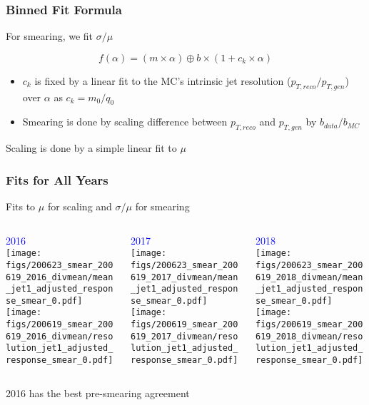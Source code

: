 \documentclass{beamer}
\begin{document}
\begin{frame}
  \frametitle{Binned Fit Formula}

  For smearing, we fit $\sigma/\mu$

  \[
  f(\alpha) = (m \times \alpha) \oplus b \times (1 + c_k \times \alpha)
  \]

  \begin{itemize}
  \item $c_k$ is fixed by a linear fit to the MC's intrinsic jet resolution ($p_{T, reco}/p_{T, gen}$) over $\alpha$ as $c_k = m_0/q_0$
  \item Smearing is done by scaling difference between $p_{T,reco}$ and $p_{T,gen}$ by $b_{data}/b_{MC}$
  \end{itemize}

  \vfill

  Scaling is done by a simple linear fit to $\mu$

\end{frame}


\begin{frame}
  \frametitle{Fits for All Years}

  Fits to $\mu$ for scaling and $\sigma/\mu$ for smearing
  \vfill

  \begin{columns}
    \begin{column}{0.33\linewidth}
      \centering
      \textcolor{blue}{2016} \\
      \texttt{[image: figs/200623\_smear\_200619\_2016\_divmean/mean\_jet1\_adjusted\_response\_smear\_0.pdf]} \\
      \texttt{[image: figs/200619\_smear\_200619\_2016\_divmean/resolution\_jet1\_adjusted\_response\_smear\_0.pdf]}
    \end{column}
    \begin{column}{0.34\linewidth}
      \centering
      \textcolor{blue}{2017} \\
      \texttt{[image: figs/200623\_smear\_200619\_2017\_divmean/mean\_jet1\_adjusted\_response\_smear\_0.pdf]} \\
      \texttt{[image: figs/200619\_smear\_200619\_2017\_divmean/resolution\_jet1\_adjusted\_response\_smear\_0.pdf]}
    \end{column}
    \begin{column}{0.33\linewidth}
      \centering
      \textcolor{blue}{2018} \\
      \texttt{[image: figs/200623\_smear\_200619\_2018\_divmean/mean\_jet1\_adjusted\_response\_smear\_0.pdf]} \\
      \texttt{[image: figs/200619\_smear\_200619\_2018\_divmean/resolution\_jet1\_adjusted\_response\_smear\_0.pdf]}
    \end{column}
  \end{columns}

  \vfill
  2016 has the best pre-smearing agreement

\end{frame}
\end{document}
